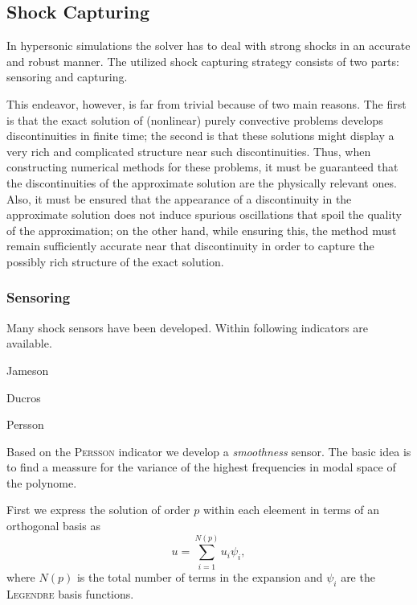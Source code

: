 \subsection{Shock Capturing}

In hypersonic simulations the solver has to deal with strong shocks in an
accurate and robust manner. The utilized shock capturing strategy consists of
two parts: sensoring and capturing.

This endeavor, however, is far from trivial because of two main reasons.
The first is that the exact solution of (nonlinear) purely convective problems
develops discontinuities in finite time; the second is that these solutions might
display a very rich and complicated structure near such discontinuities. Thus,
when constructing numerical methods for these problems, it must be 
guaranteed that the discontinuities of the approximate solution are the physically
relevant ones. Also, it must be ensured that the appearance of a discontinuity
in the approximate solution does not induce spurious oscillations that spoil
the quality of the approximation; on the other hand, while ensuring this, the
method must remain sufficiently accurate near that discontinuity in order to
capture the possibly rich structure of the exact solution.



\subsubsection{Sensoring}

Many shock sensors have been developed. Within \FLEXI following indicators
are available.

\begin{description}
    \item[Jameson]\cite{jameson1981}
    \item[Ducros] \cite{ducros1999}
    \item[Persson] \cite{persson2006}
\end{description}

Based on the \textsc{Persson} indicator we develop a \emph{smoothness} sensor.
The basic idea is to find a meassure for the variance of the highest
frequencies in modal space of the polynome.

First we express the solution of order $p$ within each eleement in terms of
an orthogonal basis as
\begin{equation}
    u = \sum^{N(p)}_{i=1} u_i \psi_i,
\end{equation}
where $N(p)$ is the total number of terms in the expansion and $\psi_i$ are the
\textsc{Legendre} basis functions.


